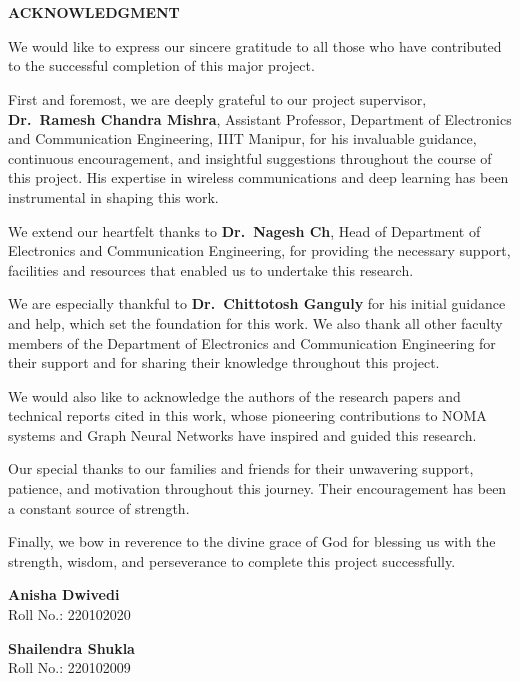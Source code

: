 \chapter*{}
\thispagestyle{empty}

\begin{center}
    \vspace*{-0.5cm}
    {\Large \textbf{ACKNOWLEDGMENT}}
\end{center}

\vspace{0.6cm}

We would like to express our sincere gratitude to all those who have contributed to the successful completion of this major project.

First and foremost, we are deeply grateful to our project supervisor, \textbf{Dr.~Ramesh Chandra Mishra}, Assistant Professor, Department of Electronics and Communication Engineering, IIIT Manipur, for his invaluable guidance, continuous encouragement, and insightful suggestions throughout the course of this project. His expertise in wireless communications and deep learning has been instrumental in shaping this work.

We extend our heartfelt thanks to \textbf{Dr.~Nagesh Ch}, Head of Department of Electronics and Communication Engineering, for providing the necessary support, facilities and resources that enabled us to undertake this research.

We are especially thankful to \textbf{Dr.~Chittotosh Ganguly} for his initial guidance and help, which set the foundation for this work. We also thank all other faculty members of the Department of Electronics and Communication Engineering for their support and for sharing their knowledge throughout this project.

We would also like to acknowledge the authors of the research papers and technical reports cited in this work, whose pioneering contributions to NOMA systems and Graph Neural Networks have inspired and guided this research.

Our special thanks to our families and friends for their unwavering support, patience, and motivation throughout this journey. Their encouragement has been a constant source of strength.

Finally, we bow in reverence to the divine grace of God for blessing us with the strength, wisdom, and perseverance to complete this project successfully.

\vspace{2cm}

\noindent
\begin{minipage}[t]{0.48\textwidth}
\raggedright
\textbf{Anisha Dwivedi}\\
Roll No.: 220102020
\end{minipage}
\hfill
\begin{minipage}[t]{0.48\textwidth}
\raggedright
\textbf{Shailendra Shukla}\\
Roll No.: 220102009
\end{minipage}

\newpage
